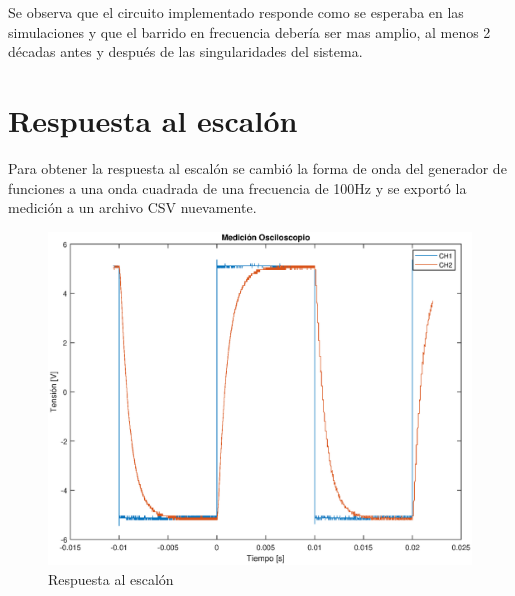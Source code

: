 \documentclass[10pt,a4paper]{article} %
\begin{document}
Se observa que el circuito implementado responde como se esperaba en las simulaciones y que el barrido en frecuencia debería ser mas amplio, al menos 2 décadas antes y después de las singularidades del sistema.

\section{Respuesta al escalón}

Para obtener la respuesta al escalón se cambió la forma de onda del generador de funciones a una onda cuadrada de una frecuencia de 100Hz y se exportó la medición a un archivo CSV nuevamente.

\begin{figure}[H]
	\begin{center}
		\includegraphics[scale=0.4]{escalonmedido}
		\caption{Respuesta al escalón}
	\end{center}
\end{figure}
\end{document}
